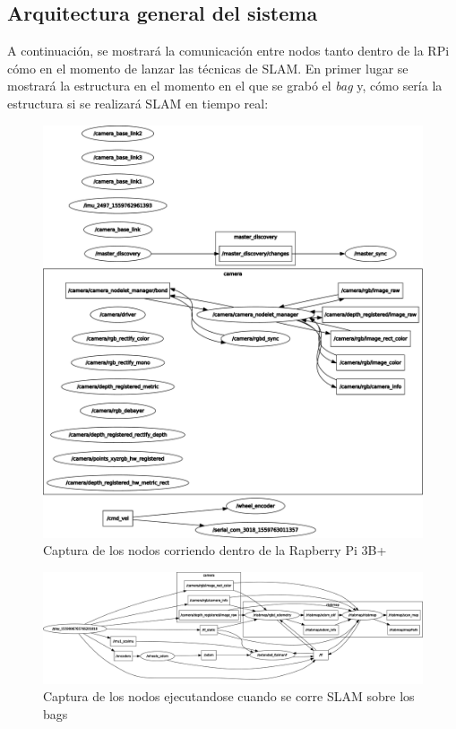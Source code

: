 \subsection{Arquitectura general del sistema}
A continuación, se mostrará la comunicación entre nodos tanto dentro de la RPi cómo en el momento de lanzar las técnicas de SLAM. En primer lugar se mostrará la estructura en el momento en el que se grabó
el \textit{bag} y, cómo sería la estructura si se realizará SLAM en tiempo real:
\begin{figure}[!ht]
    \centering
    \includegraphics[width=.8\textwidth]{images/rqt_graphs/rpi_onboardBAG.pdf}
    \caption{Captura de los nodos corriendo dentro de la Rapberry Pi 3B+}
    \label{rqt01}
\end{figure}

\begin{figure}[!ht]
    \centering
    \includegraphics[width=.8\textwidth]{images/rqt_graphs/graph_RTABMAP.pdf}
    \caption{Captura de los nodos ejecutandose cuando se corre SLAM sobre los bags}
    \label{rqt01}
\end{figure}


